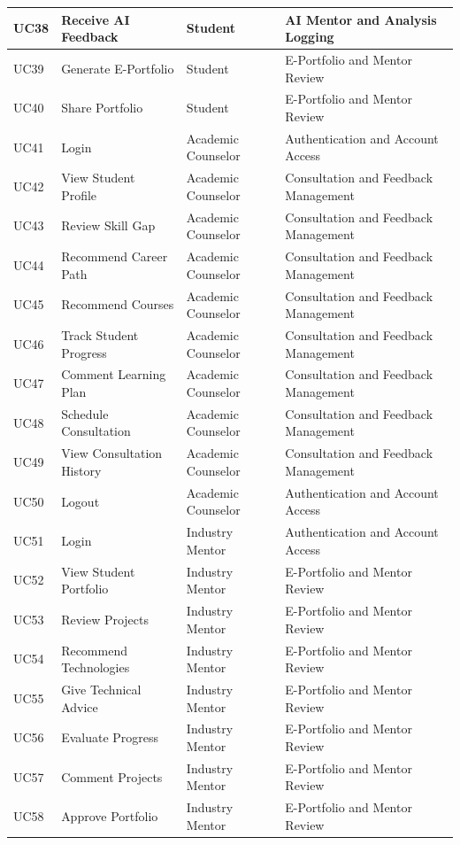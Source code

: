 \begin{longtable}{|>{\centering\arraybackslash}m{0.8cm}|>{\raggedright\arraybackslash}m{3.0cm}|>{\raggedright\arraybackslash}m{2.4cm}|>{\raggedright\arraybackslash}m{4.8cm}|}
\hline
UC38 & Receive AI Feedback & Student & AI Mentor and Analysis Logging \\
\hline
UC39 & Generate E-Portfolio & Student & E-Portfolio and Mentor Review \\
\hline
UC40 & Share Portfolio & Student & E-Portfolio and Mentor Review \\
\hline
UC41 & Login & Academic Counselor & Authentication and Account Access \\
\hline
UC42 & View Student Profile & Academic Counselor & Consultation and Feedback Management \\
\hline
UC43 & Review Skill Gap & Academic Counselor & Consultation and Feedback Management \\
\hline
UC44 & Recommend Career Path & Academic Counselor & Consultation and Feedback Management \\
\hline
UC45 & Recommend Courses & Academic Counselor & Consultation and Feedback Management \\
\hline
UC46 & Track Student Progress & Academic Counselor & Consultation and Feedback Management \\
\hline
UC47 & Comment Learning Plan & Academic Counselor & Consultation and Feedback Management \\
\hline
UC48 & Schedule Consultation & Academic Counselor & Consultation and Feedback Management \\
\hline
UC49 & View Consultation History & Academic Counselor & Consultation and Feedback Management \\
\hline
UC50 & Logout & Academic Counselor & Authentication and Account Access \\
\hline
UC51 & Login & Industry Mentor & Authentication and Account Access \\
\hline
UC52 & View Student Portfolio & Industry Mentor & E-Portfolio and Mentor Review \\
\hline
UC53 & Review Projects & Industry Mentor & E-Portfolio and Mentor Review \\
\hline
UC54 & Recommend Technologies & Industry Mentor & E-Portfolio and Mentor Review \\
\hline
UC55 & Give Technical Advice & Industry Mentor & E-Portfolio and Mentor Review \\
\hline
UC56 & Evaluate Progress & Industry Mentor & E-Portfolio and Mentor Review \\
\hline
UC57 & Comment Projects & Industry Mentor & E-Portfolio and Mentor Review \\
\hline
UC58 & Approve Portfolio & Industry Mentor & E-Portfolio and Mentor Review \\

\end{longtable}
